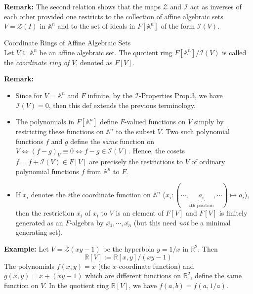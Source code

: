 \noindent\textbf{Remark:} The second relation shows that the maps $\mathcal{Z}$ and $\mathcal{I}$ act as inverses of each other provided one restricts to the collection of affine algebraic sets $V= \mathcal{Z}(I)$ in $\mathbb{A}^n$ and to the set of ideals in $F[\mathbb{A}^n]$ of the form $\mathcal{I}(V)$.

\begin{definition}{Coordinate Rings of Affine Algebraic Sets}\\
Let $V \subseteq \mathbb{A}^n$ be an affine algebraic set. The quotient ring $F[\mathbb{A}^n] /\mathcal{I}(V)$ is called the \textit{coordinate ring of $V$}, denoted as $F[V]$.
\end{definition}

\noindent\textbf{Remark:} \begin{itemize}
    \item Since for $V=\mathbb{A}^n$ and $F$ infinite, by the $\mathcal{I}$-Properties Prop.3, we have $\mathcal{I}(V)=0$, then this def extends the previous terminology.

    \item The polynomials in $F[\mathbb{A}^n]$ define $F$-valued functions on $V$ simply by restricting these functions on $\mathbb{A}^n$ to the subset $V$. Two such polynomial functions $f$ and $g$ define the \textit{same} function on $V\Leftrightarrow (f-g)_V \equiv 0 \Leftrightarrow f-g\in \mathcal{I}(V)$. Hence, the cosets $\overline{f} =f +\mathcal{I}(V) \in F[V]$ are precisely the restrictions to $V$ of ordinary polynomial functions $f$ from $\mathbb{A}^n$ to $F$.

    \item If $x_i$ denotes the $i$the coordinate function on $\mathbb{A}^n$ ($x_i :(\cdots, \underbrace{a_i}_{i\text{th position}}, \cdots) \mapsto a_i$), then the restriction $\overline{x_i}$ of $x_i$ to $V$ is an element of $F[V]$ and $F[V]$ is finitely generated as an $F$-algebra by $\overline{x_1} ,\cdots, \overline{x_n}$ (but this need \textit{not} be a minimal generating set).
\end{itemize}

\noindent\textbf{Example:} Let $V= \mathcal{Z} (xy-1)$ be the hyperbola $y=1/x$ in $\mathbb{R}^2$. Then
$$\mathbb{R}[V]:= \mathbb{R}[x,y] /(xy-1)$$
The polynomials $f(x,y)=x$ (the $x$-coordinate function) and $g(x,y)= x+(xy-1)$ which are different functions on $\mathbb{R}^2$, define the same function on $V$. In the quotient ring $\mathbb{R}[V]$, we have $\overline{f} (a,b) =f(a,1/a)$.

